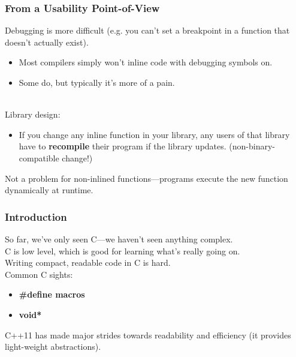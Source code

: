 \begin{frame}
  \frametitle{From a Usability Point-of-View}

  
  Debugging is more difficult (e.g. you can't set a breakpoint in a function that
  doesn't actually exist).
  \begin{itemize}
    \item Most compilers simply won't inline code with debugging symbols on.
    \item Some do, but typically it's more of a pain.
  \end{itemize}~\\[1em]

  Library design:
  \begin{itemize}
    \item If you change any inline function in your library, any users
      of that library have to {\bf recompile} their program if the
      library updates. (non-binary-compatible change!)
  \end{itemize}
  Not a problem for non-inlined functions---programs execute the new function
      dynamically at runtime.

  
\end{frame}

\begin{frame}
  \frametitle{Introduction}

  
    So far, we've only seen C---we haven't seen anything 
      complex.\\[1em]

    C is low level, which is good for learning what's
    really going on.\\[2em]

    Writing compact, readable code in C is hard. \\ Common C sights:
      \begin{itemize}
        \item {\bf \#define macros}
        \item {\bf void*}
      \end{itemize}
    C++11 has made major strides towards readability and efficiency
      (it provides light-weight abstractions).
  
\end{frame}

